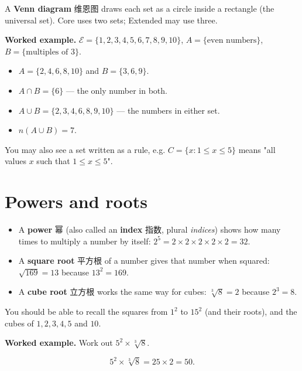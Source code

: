 \documentclass[11pt]{article}
\begin{document}
A \textbf{Venn diagram} 维恩图 draws each set as a circle inside a rectangle (the universal set). Core uses two sets; Extended may use three.

\textbf{Worked example.} $\mathscr{E} = \{1,2,3,4,5,6,7,8,9,10\}$, $A = \{\text{even numbers}\}$, $B = \{\text{multiples of } 3\}$.

\begin{itemize}
\item $A = \{2,4,6,8,10\}$ and $B = \{3,6,9\}$.

\item $A \cap B = \{6\}$ — the only number in both.

\item $A \cup B = \{2,3,4,6,8,9,10\}$ — the numbers in either set.

\item $n(A \cup B) = 7$.

\end{itemize}

You may also see a set written as a rule, e.g. $C = \{x : 1 \leqslant x \leqslant 5\}$ means "all values $x$ such that $1 \leqslant x \leqslant 5$".

\section*{Powers and roots}

\begin{itemize}
\item A \textbf{power} 幂 (also called an \textbf{index} 指数, plural \emph{indices}) shows how many times to multiply a number by itself: $2^{5} = 2 \times 2 \times 2 \times 2 \times 2 = 32$.

\item A \textbf{square root} 平方根 of a number gives that number when squared: $\sqrt{169} = 13$ because $13^{2} = 169$.

\item A \textbf{cube root} 立方根 works the same way for cubes: $\sqrt[3]{8} = 2$ because $2^{3} = 8$.

\end{itemize}

You should be able to recall the squares from $1^2$ to $15^2$ (and their roots), and the cubes of $1, 2, 3, 4, 5$ and $10$.

\textbf{Worked example.} Work out $5^{2} \times \sqrt[3]{8}$.

\[
5^{2} \times \sqrt[3]{8} = 25 \times 2 = 50.
\]
\end{document}
